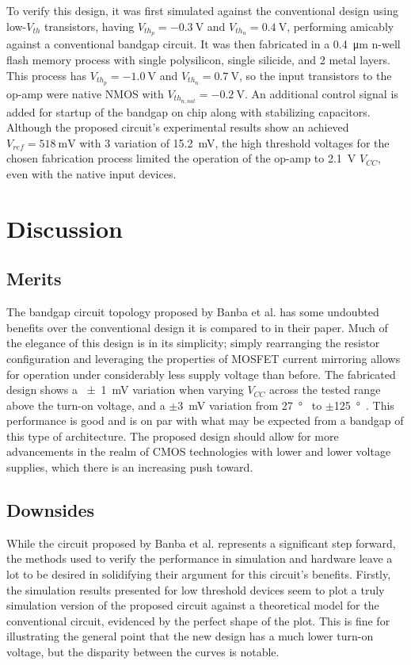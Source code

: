 \documentclass[journal]{IEEEtran}
\begin{document}
To verify this design, it was first simulated against the conventional design using low-\(V_{th}\) transistors, having \(V_{th_p} = \qty{-0.3}{\V}\) and \(V_{th_n} = \qty{0.4}{\V}\), performing amicably against a conventional bandgap circuit. It was then fabricated in a \qty{0.4}{\um} n-well flash memory process with single polysilicon, single silicide, and 2 metal layers. This process has \(V_{th_p} = \qty{-1.0}{\V}\) and \(V_{th_n} = \qty{0.7}{\V}\), so the input transistors to the op-amp were native NMOS with \(V_{th_{n,nat}} = \qty{-0.2}{\V}\). An additional control signal is added for startup of the bandgap on chip along with stabilizing capacitors. Although the proposed circuit's experimental results show an achieved \(V_{ref} = \qty{518}{\mV}\) with \qty{3}{\sig} variation of \qty{15.2}{\mV}, the high threshold voltages for the chosen fabrication process limited the operation of the op-amp to \qty{2.1}{\V} \(V_{CC}\), even with the native input devices.

\section{Discussion}

\subsection{Merits}
The bandgap circuit topology proposed by Banba et al. has some undoubted benefits over the conventional design it is compared to in their paper. Much of the elegance of this design is in its simplicity; simply rearranging the resistor configuration and leveraging the properties of MOSFET current mirroring allows for operation under considerably less supply voltage than before. The fabricated design shows a \qty{\pm 1}{\mV} variation when varying \(V_{CC}\) across the tested range above the turn-on voltage, and a $\pm$\qty{3}{\mV} variation from \qty{27}{\degree\C} to $\pm$\qty{125}{\degree\C}. This performance is good and is on par with what may be expected from a bandgap of this type of architecture. The proposed design should allow for more advancements in the realm of CMOS technologies with lower and lower voltage supplies, which there is an increasing push toward.

\subsection{Downsides}

While the circuit proposed by Banba et al. represents a significant step forward, the methods used to verify the performance in simulation and hardware leave a lot to be desired in solidifying their argument for this circuit's benefits. Firstly, the simulation results presented for low threshold devices seem to plot a truly simulation version of the proposed circuit against a theoretical model for the conventional circuit, evidenced by the perfect shape of the plot. This is fine for illustrating the general point that the new design has a much lower turn-on voltage, but the disparity between the curves is notable.
\end{document}
